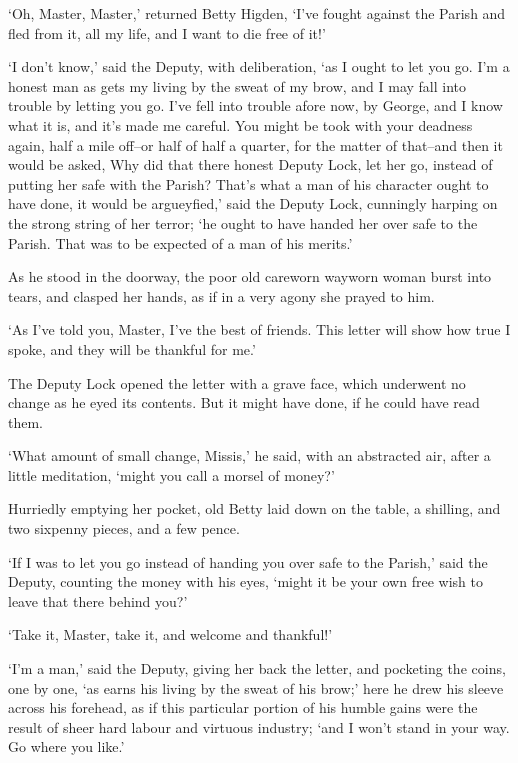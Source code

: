 ‘Oh, Master, Master,’ returned Betty Higden, ‘I’ve fought against the
Parish and fled from it, all my life, and I want to die free of it!’

‘I don’t know,’ said the Deputy, with deliberation, ‘as I ought to let
you go. I’m a honest man as gets my living by the sweat of my brow, and
I may fall into trouble by letting you go. I’ve fell into trouble afore
now, by George, and I know what it is, and it’s made me careful. You
might be took with your deadness again, half a mile off--or half of half
a quarter, for the matter of that--and then it would be asked, Why did
that there honest Deputy Lock, let her go, instead of putting her safe
with the Parish? That’s what a man of his character ought to have done,
it would be argueyfied,’ said the Deputy Lock, cunningly harping on the
strong string of her terror; ‘he ought to have handed her over safe to
the Parish. That was to be expected of a man of his merits.’

As he stood in the doorway, the poor old careworn wayworn woman burst
into tears, and clasped her hands, as if in a very agony she prayed to
him.

‘As I’ve told you, Master, I’ve the best of friends. This letter will
show how true I spoke, and they will be thankful for me.’

The Deputy Lock opened the letter with a grave face, which underwent no
change as he eyed its contents. But it might have done, if he could have
read them.

‘What amount of small change, Missis,’ he said, with an abstracted air,
after a little meditation, ‘might you call a morsel of money?’

Hurriedly emptying her pocket, old Betty laid down on the table, a
shilling, and two sixpenny pieces, and a few pence.

‘If I was to let you go instead of handing you over safe to the Parish,’
said the Deputy, counting the money with his eyes, ‘might it be your own
free wish to leave that there behind you?’

‘Take it, Master, take it, and welcome and thankful!’

‘I’m a man,’ said the Deputy, giving her back the letter, and pocketing
the coins, one by one, ‘as earns his living by the sweat of his brow;’
here he drew his sleeve across his forehead, as if this particular
portion of his humble gains were the result of sheer hard labour and
virtuous industry; ‘and I won’t stand in your way. Go where you like.’

